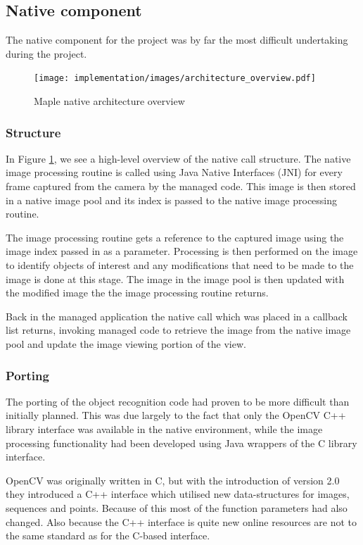 \subsection{Native component}
The native component for the project was by far the most difficult undertaking during the project. 

\begin{figure}[h!]
\centering
    \texttt{[image: implementation/images/architecture\_overview.pdf]}
    \caption{Maple native architecture overview}%
    \label{native_architecture}
\end{figure}

\subsubsection{Structure}
In Figure \ref{native_architecture}, we see a high-level overview of the native call structure. The native image processing routine is called using Java Native Interfaces (JNI) for every frame captured from the camera by the managed code. This image is then stored in a native image pool and its index is passed to the native image processing routine.

The image processing routine gets a reference to the captured image using the image index passed in as a parameter. Processing is then performed on the image to identify objects of interest and any modifications that need to be made to the image is done at this stage. The image in the image pool is then updated with the modified image the the image processing routine returns.

Back in the managed application the native call which was placed in a callback list returns, invoking managed code to retrieve the image from the native image pool and update the image viewing portion of the view.

\subsubsection{Porting}
The porting of the object recognition code had proven to be more difficult than initially planned. This was due largely to the fact that only the OpenCV C++ library interface was available in the native environment, while the image processing functionality had been developed using Java wrappers of the C library interface.

OpenCV was originally written in C, but with the introduction of version 2.0 they introduced a C++ interface which utilised new data-structures for images, sequences and points. Because of this most of the function parameters had also changed. Also because the C++ interface is quite new online resources are not to the same standard as for the C-based interface.

